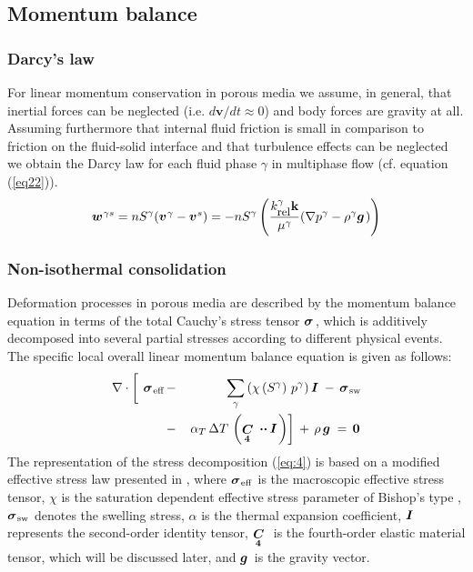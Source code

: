 \subsection{Momentum balance}
\label{sec:momentum_balance}



\subsubsection{Darcy's law}

For linear momentum conservation in porous media we assume, in general, that inertial
forces can be neglected (i.e. $d\mathbf{v}/dt\approx 0$) and
body forces are gravity at all.
Assuming furthermore that internal fluid friction is small in comparison to
friction on the fluid-solid interface and that turbulence effects
can be neglected we obtain the Darcy law for each fluid phase
$\gamma$ in multiphase flow (cf. equation (\ref{eq22})).
%
\begin{eqnarray}
\mio{w}{\gamma s}{}
=
n S^\gamma (\mio{v}{\gamma}{} - \mio{v}{s}{})
=
-
n S^\gamma
\left(
\frac{k_{\mbox{\small rel}}^{\gamma} \bf k}{\mu^\gamma}
(
\nabla p^\gamma
-
\rho^\gamma \mio{g}{}{}
)
\right)
\label{eqn:momentum_balance_fluid}
\end{eqnarray}

\subsubsection{Non-isothermal consolidation}

Deformation processes in porous media are described by the momentum balance equation in terms of the total Cauchy's stress tensor $\mbox{${\mbox{\boldmath${\sigma}$\unboldmath}}_{\:\!}$}$, which is additively decomposed into several partial stresses according to different physical events. The specific local overall linear momentum balance equation is given as follows:
%
\begin{eqnarray}
\nabla\cdot\left[
\phantom{\left(\fourtens{I}\right)}\!\!\!\!\!\!\!\!\!\!\!\!
\miu{\sigma}{\mathrm{eff}}{}\right. & - & \sum_\gamma \left( \chi\left(S^{\mathrm\gamma}\right)\,p^{\mathrm\gamma} \right) \miu{I}{}{}
\,-\,\miu{\sigma}{\mathrm{sw}}{}
\nonumber \\
& - & \left.\alpha_T\,\Delta T\,\left(\fourtens{C}\ccdot\miu{I}{}{}\right)
\right]
\,+\,\rho\,\miu{g}{}{}\,=\,\miu{0}{}{}
\label{eq:4}
\end{eqnarray}
%
The representation of the stress decomposition (\ref{eq:4}) is based on a modified effective stress law presented in \cite{RBCetal:2001}, where $\mbox{${\mbox{\boldmath${\sigma}$\unboldmath}}_{\:\!\mathrm{eff}}$}$ is the macroscopic effective stress tensor, $\chi$ is the saturation dependent effective stress parameter of Bishop's type \cite{BB:1963}, $\mbox{${\mbox{\boldmath${\sigma}$\unboldmath}}_{\:\!\mathrm{sw}}$}$ denotes the swelling stress, $\alpha$ is the thermal expansion coefficient, $\mbox{${\mbox{\boldmath${I}$\unboldmath}}_{\:\!}$}$ represents the second-order identity tensor, $\mbox{${\mbox{\boldmath$\textstyle{\mathop{C}\limits_{\bf 4}}$ \unboldmath}}$}$ is the fourth-order elastic material tensor, which will be discussed later, and $\mbox{${\mbox{\boldmath${g}$\unboldmath}}^{\:\!}$}$ is the gravity vector.